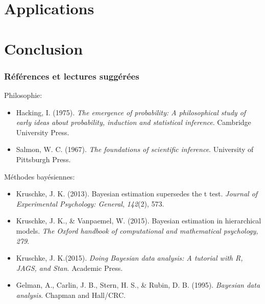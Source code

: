\documentclass{beamer}
\begin{document}
\section{Applications}



\section{Conclusion}

\begin{frame}
    \frametitle{Références et lectures suggérées}

    Philosophie:
    \begin{itemize}
      \item Hacking, I. (1975). \emph{The emergence of probability:
            A philosophical study of early ideas about probability,
            induction and statistical inference}. Cambridge University Press.
      \item Salmon, W. C. (1967). \emph{The foundations of scientific inference}.
            University of Pittsburgh Press.
    \end{itemize}

    Méthodes bayésiennes:
    \begin{itemize}
      \item Kruschke, J. K. (2013). Bayesian estimation supersedes the t test.
            \emph{Journal of Experimental Psychology: General}, \emph{142}(2), 573.
      \item Kruschke, J. K., \& Vanpaemel, W. (2015). Bayesian estimation in hierarchical models.
            \emph{The Oxford handbook of computational and mathematical psychology, 279}.
      \item Kruschke, J. K.(2015). \emph{Doing Bayesian data analysis: A tutorial with R, JAGS, and Stan}.
            Academic Press.
      \item Gelman, A., Carlin, J. B., Stern, H. S., \& Rubin, D. B. (1995).
            \emph{Bayesian data analysis}. Chapman and Hall/CRC.
    \end{itemize}
\end{frame}


\end{document}
